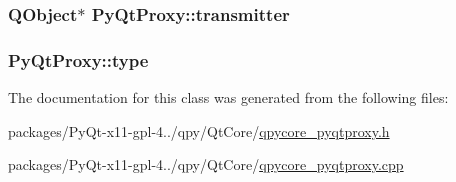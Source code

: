 \subsubsection[{transmitter}]{\setlength{\rightskip}{0pt plus 5cm}Q\+Object$\ast$ Py\+Qt\+Proxy\+::transmitter}\label{classPyQtProxy_a6f2c3c1d885dc60d5afbe791a4a9f3a1}
\hypertarget{classPyQtProxy_a9d5771a73e4cd9ec2adc51392eb85647}{}
\subsubsection[{type}]{ Py\+Qt\+Proxy\+::type}\label{classPyQtProxy_a9d5771a73e4cd9ec2adc51392eb85647}


The documentation for this class was generated from the following files\+:\begin{DoxyCompactItemize}
\item 
packages/\+Py\+Qt-\/x11-\/gpl-\/4../qpy/\+Qt\+Core/\hyperlink{qpycore__pyqtproxy_8h}{qpycore\+\_\+pyqtproxy.\+h}\item 
packages/\+Py\+Qt-\/x11-\/gpl-\/4../qpy/\+Qt\+Core/\hyperlink{qpycore__pyqtproxy_8cpp}{qpycore\+\_\+pyqtproxy.\+cpp}\end{DoxyCompactItemize}
